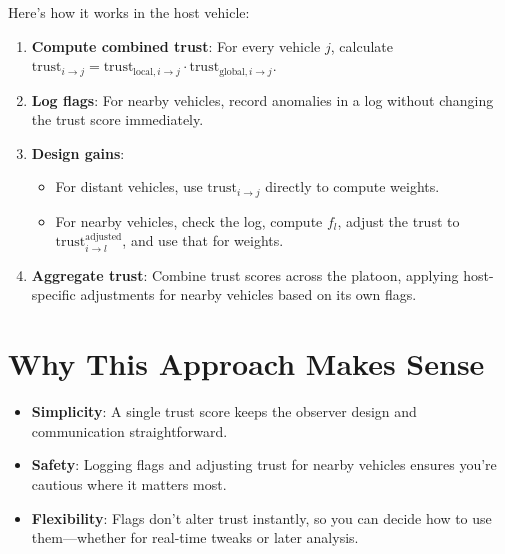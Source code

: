 \documentclass{article}
\begin{document}
Here's how it works in the host vehicle:
\begin{enumerate}
    \item \textbf{Compute combined trust}: For every vehicle \( j \), calculate \( \text{trust}_{i \to j} = \text{trust}_{\text{local}, i \to j} \cdot \text{trust}_{\text{global}, i \to j} \).
    \item \textbf{Log flags}: For nearby vehicles, record anomalies in a log without changing the trust score immediately.
    \item \textbf{Design gains}:
    \begin{itemize}
        \item For distant vehicles, use \( \text{trust}_{i \to j} \) directly to compute weights.
        \item For nearby vehicles, check the log, compute \( f_l \), adjust the trust to \( \text{trust}_{i \to l}^{\text{adjusted}} \), and use that for weights.
    \end{itemize}
    \item \textbf{Aggregate trust}: Combine trust scores across the platoon, applying host-specific adjustments for nearby vehicles based on its own flags.
\end{enumerate}

\section{Why This Approach Makes Sense}

\begin{itemize}
    \item \textbf{Simplicity}: A single trust score keeps the observer design and communication straightforward.
    \item \textbf{Safety}: Logging flags and adjusting trust for nearby vehicles ensures you're cautious where it matters most.
    \item \textbf{Flexibility}: Flags don't alter trust instantly, so you can decide how to use them---whether for real-time tweaks or later analysis.
\end{itemize}
\end{document}
